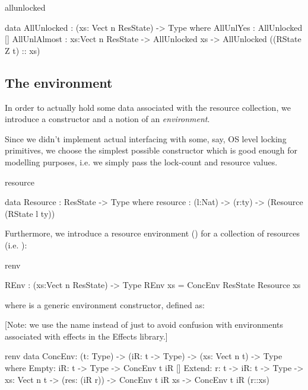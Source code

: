 \begin{SaveVerbatim}{allunlocked}

data AllUnlocked : (xs: Vect n ResState) -> Type where
    AllUnlYes : AllUnlocked []
    AllUnlAlmost : {xs:Vect n ResState} -> AllUnlocked xs ->
        AllUnlocked ((RState Z t) :: xs)

\end{SaveVerbatim}

\subsection{The environment}

In order to actually hold some data associated with the resource collection, we
introduce a  constructor and a notion of an \emph{environment}.

Since we didn't implement actual interfacing with some, say, OS level locking
primitives, we choose the simplest possible  constructor which
is good enough for modelling purposes, i.e. we simply pass the lock-count and
resource values.

\begin{SaveVerbatim}{resource}

data Resource : ResState -> Type where
     resource : (l:Nat) -> (r:ty) -> (Resource (RState l ty))

\end{SaveVerbatim}

Furthermore, we introduce a resource environment () for a collection
of resources (i.e. ):

\begin{SaveVerbatim}{renv}

REnv : (xs:Vect n ResState) -> Type
REnv xs = ConcEnv ResState Resource xs

\end{SaveVerbatim}

where  is a generic environment constructor, defined as:

[Note: we use the name  instead of just  to avoid
confusion with environments associated with effects in the Effects library.]

\begin{SaveVerbatim}{renv}
data ConcEnv: (t: Type) -> (iR: t -> Type) -> (xs: Vect n t) -> Type where
   Empty:  {iR: t -> Type} -> ConcEnv t iR []
   Extend: {r: t} -> {iR: t -> Type} -> {xs: Vect n t} ->
                     (res: (iR r)) -> ConcEnv t iR xs ->
                     ConcEnv t iR (r::xs)
\end{SaveVerbatim}

